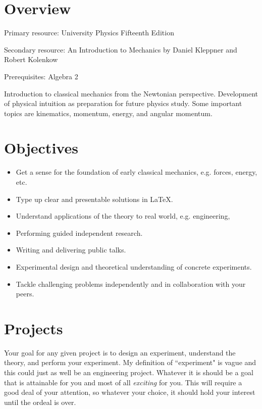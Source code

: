 \documentclass{article}
\begin{document}
\section{Overview}

Primary resource: University Physics Fifteenth Edition

Secondary resource: An Introduction to Mechanics by Daniel Kleppner and Robert Kolenkow

Prerequisites: Algebra 2

Introduction to classical mechanics from the Newtonian perspective.
Development of physical intuition as preparation for future physics study.
Some important topics are kinematics, momentum, energy, and angular momentum.

\section{Objectives}

\begin{itemize}

\item Get a sense for the foundation of early classical mechanics, e.g. forces, energy, etc.

\item Type up clear and presentable solutions in LaTeX.

\item Understand applications of the theory to real world, e.g. engineering,

\item Performing guided independent research.

\item Writing and delivering public talks.

\item Experimental design and theoretical understanding of concrete experiments.

\item Tackle challenging problems independently and in collaboration with your peers.

\end{itemize}


\section{Projects}

Your goal for any given project is to design an experiment, understand the theory, and perform your experiment.
My definition of ``experiment" is vague and this could just as well be an engineering project.
Whatever it is should be a goal that is attainable for you and most of all \textit{exciting} for you.
This will require a good deal of your attention, so whatever your choice, it should hold your interest until the ordeal is over.
\end{document}
